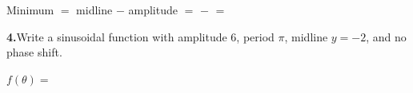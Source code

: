 \documentclass[10pt]{article}
\begin{document}
\begin{tcolorbox}[colback=white, colframe=black!40,
    title=\textbf{Tier R --- Reinforce},
    fonttitle=\bfseries, arc=2mm, left=3mm, right=3mm, top=2mm, bottom=2mm]
\vspace{4pt}
Minimum $= $ midline $-$ amplitude $= $ \underline{\hspace{1cm}} $-$ \underline{\hspace{1cm}} $=$ \underline{\hspace{1.5cm}}

\vspace{6pt}
\textbf{4.}\quad Write a sinusoidal function with amplitude 6, period $\pi$,
midline $y = -2$, and no phase shift.

\vspace{4pt}
$f(\theta) = $ \underline{\hspace{6cm}}

\end{tcolorbox}

\vspace{0.08in}
\end{document}
